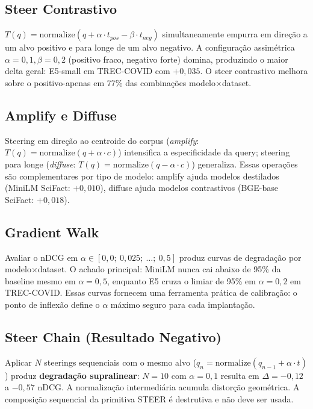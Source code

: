 \documentclass{article}
\begin{document}
\subsection{Steer Contrastivo}

$T(q) = \text{normalize}(q + \alpha \cdot t_{pos} - \beta \cdot t_{neg})$ simultaneamente empurra em direção a um alvo positivo e para longe de um alvo negativo. A configuração assimétrica $\alpha{=}0{,}1, \beta{=}0{,}2$ (positivo fraco, negativo forte) domina, produzindo o maior delta geral: E5-small em TREC-COVID com $+0{,}035$. O steer contrastivo melhora sobre o positivo-apenas em 77\% das combinações modelo$\times$dataset.

\subsection{Amplify e Diffuse}

Steering em direção ao centroide do corpus (\emph{amplify}: $T(q) = \text{normalize}(q + \alpha \cdot c)$) intensifica a especificidade da query; steering para longe (\emph{diffuse}: $T(q) = \text{normalize}(q - \alpha \cdot c)$) generaliza. Essas operações são complementares por tipo de modelo: amplify ajuda modelos destilados (MiniLM SciFact: $+0{,}010$), diffuse ajuda modelos contrastivos (BGE-base SciFact: $+0{,}018$).

\subsection{Gradient Walk}

Avaliar o nDCG em $\alpha \in [0{,}0;\ 0{,}025;\ \ldots;\ 0{,}5]$ produz curvas de degradação por modelo$\times$dataset. O achado principal: MiniLM nunca cai abaixo de 95\% da baseline mesmo em $\alpha{=}0{,}5$, enquanto E5 cruza o limiar de 95\% em $\alpha{=}0{,}2$ em TREC-COVID. Essas curvas fornecem uma ferramenta prática de calibração: o ponto de inflexão define o $\alpha$ máximo seguro para cada implantação.

\subsection{Steer Chain (Resultado Negativo)}

Aplicar $N$ steerings sequenciais com o mesmo alvo ($q_n = \text{normalize}(q_{n-1} + \alpha \cdot t)$) produz \textbf{degradação supralinear}: $N{=}10$ com $\alpha{=}0{,}1$ resulta em $\Delta = -0{,}12$ a $-0{,}57$ nDCG. A normalização intermediária acumula distorção geométrica. A composição sequencial da primitiva STEER é destrutiva e não deve ser usada.
\end{document}
